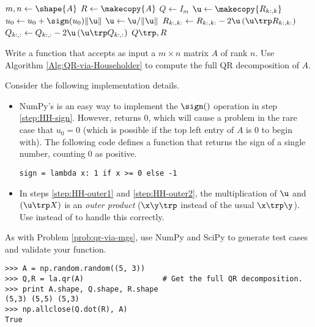 \begin{algorithm}[H] %
\begin{algorithmic}[1]
    \State $m, n \gets \shape{A}$
    \State $R \gets \makecopy{A}$
    \State $Q \gets I_{m}$
        \State $\u \gets \makecopy{R_{k:,k}}$
        \State $u_0 \gets u_0 + \sign(u_0)\|\u\|$
            \label{step:HH-sign}
        \State $\u \gets \u/\|\u\|$
        \State $R_{k:,k:} \gets R_{k:,k:} - 2\u\left(\u\trp R_{k:,k:}\right)$
            \label{step:HH-outer1}
        \State $Q_{k:,:} \gets Q_{k:,:} - 2\u\left(\u\trp Q_{k:,:}\right)$
            \label{step:HH-outer2}
    \EndFor
    \State {} $Q\trp, R$
\EndProcedure
\end{algorithmic}
\caption{}
\label{Alg:QR-via-Householder}
\end{algorithm}

\begin{problem} %
Write a function that accepts as input a $m \times n$ matrix $A$ of rank $n$.
Use Algorithm \ref{Alg:QR-via-Householder} to compute the full QR decomposition of $A$.

Consider the following implementation details.
\begin{itemize}

\item NumPy's  is an easy way to implement the $\sign()$ operation in step \ref{step:HH-sign}.
However,  returns $0$, which will cause a problem in the rare case that $u_0 = 0$ (which is possible if the top left entry of $A$ is $0$ to begin with).
The following code defines a function that returns the sign of a single number, counting $0$ as positive.

\begin{lstlisting}
sign = lambda x: 1 if x >= 0 else -1
\end{lstlisting}

\item In steps \ref{step:HH-outer1} and \ref{step:HH-outer2}, the multiplication of $\u$ and $(\u\trp X)$ is an \emph{outer product} ($\x\y\trp$ instead of the usual $\x\trp\y$).
Use  instead of  to handle this correctly.

\end{itemize}

As with Problem \ref{prob:qr-via-mgs}, use NumPy and SciPy to generate test cases and validate your function.

\begin{lstlisting}
>>> A = np.random.random((5, 3))
>>> Q,R = la.qr(A)                  # Get the full QR decomposition.
>>> print A.shape, Q.shape, R.shape
(5,3) (5,5) (5,3)
>>> np.allclose(Q.dot(R), A)
True
\end{lstlisting}
\label{prob:qr-via-hessenberg}
\end{problem}

